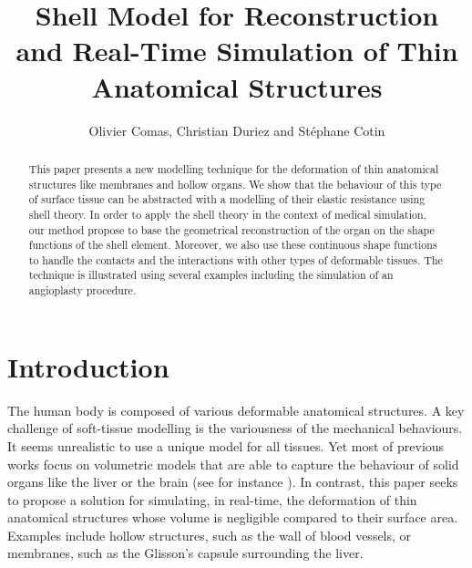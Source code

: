 \documentclass{llncs}
\begin{document}
\title{Shell Model for Reconstruction and Real-Time Simulation of Thin Anatomical Structures}
\author{Olivier Comas, Christian Duriez and St\'ephane Cotin}

\maketitle

\begin{abstract}
This paper presents a new modelling technique for the deformation of thin anatomical structures like membranes and hollow organs. We show that the behaviour of this type of surface tissue can be abstracted with a modelling of their elastic resistance using shell theory. In order to apply the shell theory in the context of medical simulation, our method propose to base the geometrical reconstruction of the organ on the shape functions of the shell element. Moreover, we also use these continuous shape functions to handle the contacts and the interactions with other types of deformable tissues. The technique is illustrated using several examples including the simulation of an angioplasty procedure.
\end{abstract}

\section{Introduction}

The human body is composed of various deformable anatomical structures. 
A key challenge of soft-tissue modelling is the variousness of the mechanical behaviours. It seems unrealistic to use a unique model for all tissues.
Yet most of previous works focus on volumetric models that are able to capture the behaviour of solid organs like the liver or the brain (see for instance \cite{Miller07,Delingette08}). In contrast, this paper seeks to propose a solution for simulating, in real-time, the deformation of thin anatomical structures whose volume is negligible compared to their surface area. Examples include hollow structures, such as the wall of blood vessels, or membranes, such as the Glisson's capsule surrounding the liver. 
\end{document}
